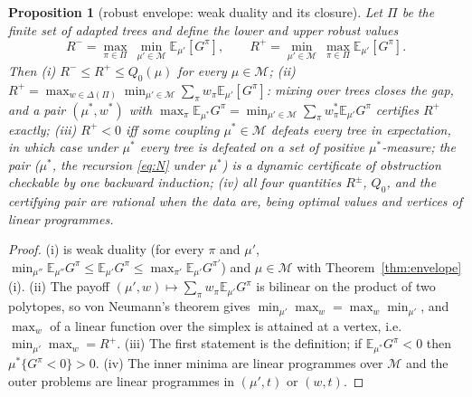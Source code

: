 \documentclass[11pt,a4paper]{article}
\theoremstyle{plain}
\newtheorem{proposition}[theorem]{Proposition}
\theoremstyle{definition}
\theoremstyle{remark}
\newcommand{\E}{\mathbb{E}}
\newcommand{\calM}{\mathcal{M}}
\begin{document}
\begin{proposition}[robust envelope: weak duality and its closure]\label{prop:robust}
Let $\Pi$ be the finite set of adapted trees and define the lower and upper robust values
\begin{equation}\label{eq:robust}
R^-=\max_{\pi\in\Pi}\ \min_{\mu'\in\calM}\E_{\mu'}[G^\pi],\qquad R^+=\min_{\mu'\in\calM}\ \max_{\pi\in\Pi}\E_{\mu'}[G^\pi].
\end{equation}
Then (i) $R^-\le R^+\le Q_0(\mu)$ for every $\mu\in\calM$; (ii) $R^+=\max_{w\in\Delta(\Pi)}\min_{\mu'\in\calM}\sum_\pi w_\pi\E_{\mu'}[G^\pi]$: mixing over trees closes the gap, and a pair $(\mu^\ast,w^\ast)$ with $\max_\pi\E_{\mu^\ast}G^\pi=\min_{\mu'\in\calM}\sum_\pi w^\ast_\pi\E_{\mu'}G^\pi$ certifies $R^+$ exactly; (iii) $R^+<0$ iff some coupling $\mu^\ast\in\calM$ defeats every tree in expectation, in which case under $\mu^\ast$ every tree is defeated on a set of positive $\mu^\ast$-measure; the pair ($\mu^\ast$, the recursion \eqref{eq:N} under $\mu^\ast$) is a dynamic certificate of obstruction checkable by one backward induction; (iv) all four quantities $R^\pm$, $Q_0$, and the certifying pair are rational when the data are, being optimal values and vertices of linear programmes.
\end{proposition}

\begin{proof}
(i) is weak duality (for every $\pi$ and $\mu'$, $\min_{\mu''}\E_{\mu''}G^\pi\le\E_{\mu'}G^\pi\le\max_{\pi'}\E_{\mu'}G^{\pi'}$) and $\mu\in\calM$ with Theorem~\ref{thm:envelope}(i). (ii) The payoff $(\mu',w)\mapsto\sum_\pi w_\pi\E_{\mu'}G^\pi$ is bilinear on the product of two polytopes, so von Neumann's theorem \cite{vonNeumann1928} gives $\min_{\mu'}\max_w=\max_w\min_{\mu'}$, and $\max_w$ of a linear function over the simplex is attained at a vertex, i.e. $\min_{\mu'}\max_w=R^+$. (iii) The first statement is the definition; if $\E_{\mu^\ast}G^\pi<0$ then $\mu^\ast\{G^\pi<0\}>0$. (iv) The inner minima are linear programmes over $\calM$ and the outer problems are linear programmes in $(\mu',t)$ or $(w,t)$.
\end{proof}
\end{document}

